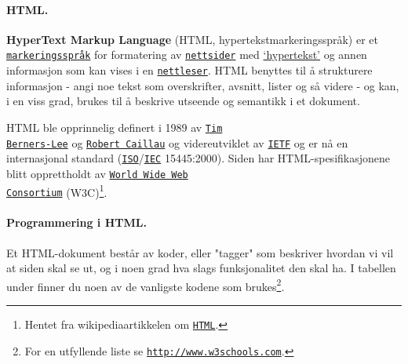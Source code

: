 \documentclass[%
oneside,                 %
final,                   %
12pt]{article}
\begin{document}
 


\paragraph{HTML.}
\label{section:teori:html} 

\textbf{HyperText Markup Language} (HTML, hypertekstmarkeringsspråk) er et
\href{{http://no.wikipedia.org/wiki/Markeringsspråk}}{\nolinkurl{markeringsspråk}} for
formatering av \href{{http://no.wikipedia.org/wiki/Nettside}}{\nolinkurl{nettsider}}
med \href{{http://no.wikipedia.org/wiki/Hypertekst}}{`hypertekst'} og annen
informasjon som kan vises i en
\href{{http://no.wikipedia.org/wiki/Nettleser}}{\nolinkurl{nettleser}}. HTML benyttes
til å strukturere informasjon - angi noe tekst som overskrifter,
avsnitt, lister og så videre - og kan, i en viss grad, brukes til å
beskrive utseende og semantikk i et dokument.

HTML ble opprinnelig definert i 1989 av \href{{https://no.wikipedia.org/wiki/Tim_Berners-Lee}}{\nolinkurl{Tim
Berners-Lee}} og
\href{{https://en.wikipedia.org/wiki/Robert_Cailliau}}{\nolinkurl{Robert Caillau}} og
videreutviklet av \href{{http://no.wikipedia.org/wiki/IETF}}{\nolinkurl{IETF}} og er
nå en internasjonal standard
(\href{{http://no.wikipedia.org/wiki/International_Organization_for_Standardization}}{\nolinkurl{ISO}}/\href{{http://no.wikipedia.org/wiki/International_Electrotechnical_Commission}}{\nolinkurl{IEC}}
15445:2000). Siden har HTML-spesifikasjonene blitt opprettholdt av
\href{{http://no.wikipedia.org/wiki/World_Wide_Web_Consortium}}{\nolinkurl{World Wide Web
Consortium}}
(W3C)\footnote{Hentet fra wikipediaartikkelen om \href{{http://no.wikipedia.org/wiki/HTML}}{\nolinkurl{HTML}}.}. 



\paragraph{Programmering i HTML.}

Et HTML-dokument består av koder, eller "tagger" som beskriver hvordan
vi vil at siden skal se ut, og i noen grad hva slags funksjonalitet
den skal ha. I tabellen under finner du noen av de vanligste kodene
som brukes\footnote{For en utfyllende liste se \href{{http://www.w3schools.com/tags/ref_byfunc.asp}}{\nolinkurl{http://www.w3schools.com}}.}.
\end{document}
